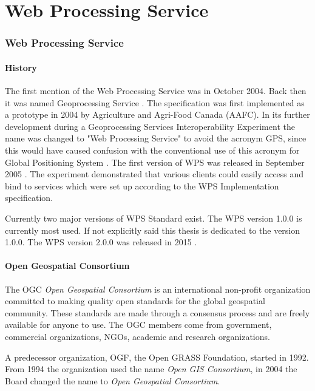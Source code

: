 \newpage
\part{Web Processing Service}
\newpage
\section{Web Processing Service}
\label{sec:WPS}

\subsection{History}
The first mention of the Web Processing Service was in October 2004. Back then it
was named Geoprocessing Service \cite{OGC_news}. The specification was first 
implemented as a prototype in 2004 by Agriculture and Agri-Food Canada (AAFC).
In its further development during a Geoprocessing Services Interoperability Experiment \cite{WPS_experiment} 
the name was changed to "Web Processing Service" to avoid the acronym GPS, since 
this would have caused confusion with the conventional use of this acronym for 
Global Positioning System \cite{WPS_standart_1.0}. The first version of WPS was released in
September 2005 \cite{WPS_first}. The experiment demonstrated that various clients
could easily access and bind to services which were set up according to the WPS Implementation
specification.

Currently two major versions of WPS Standard exist. The WPS version 1.0.0 is currently most used.
If not explicitly said this thesis is dedicated to the version 1.0.0. The WPS version 2.0.0 was
released in 2015 \cite{WPS_second}.

\subsection{Open Geospatial Consortium}
The OGC \textit{Open Geospatial Consortium} is an international non-profit organization committed to making quality 
open standards for the global geospatial community. These standards are made through a consensus process and are freely available for anyone to use. The OGC members come from government, commercial organizations, NGOs, academic and research organizations.\cite{OGC}

A predecessor organization, OGF, the Open GRASS Foundation, started in 1992. From 1994 the organization 
used the name \textit{Open GIS Consortium}, in 2004 the Board changed the name to \textit{Open Geospatial Consortium}.\cite{OGC_history}

